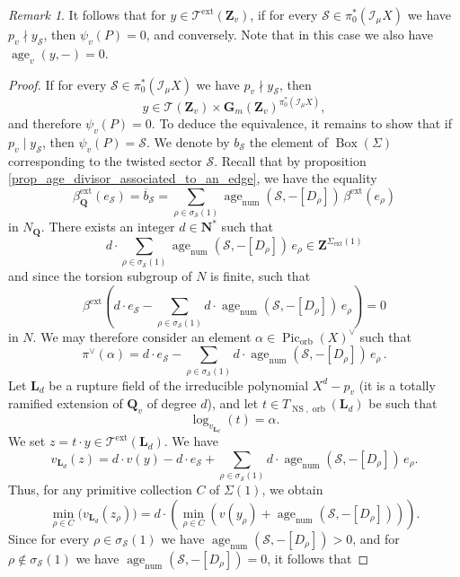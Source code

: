\documentclass{proc-l}
\newcommand{\Z}{\mathbf{Z}}
\newcommand{\N}{\mathbf{N}}
\newcommand{\Q}{\mathbf{Q}}
\newcommand{\Le}{\mathbf{L}}
\newcommand{\G}{\mathbf{G}}
\DeclareMathOperator{\Pic}{Pic}
\DeclareMathOperator{\num}{num}
\DeclareMathOperator{\age}{age}
\DeclareMathOperator{\NS}{NS}
\DeclareMathOperator{\orb}{orb}
\DeclareMathOperator{\Boxe}{Box}
\DeclareMathOperator{\ext}{ext}
\newcommand{\stackS}{\mathcal{S}}
\newcommand{\stackT}{\mathcal{T}}
\newcommand{\sheafI}{\mathcal{I}}
\newcommand{\twistsector}{\pi_0^*(\sheafI_{\mu} X)}
\theoremstyle{definition}
\theoremstyle{remark}
\newtheorem{remark}[theorem]{Remark}
\numberwithin{equation}{section}
\begin{document}
\begin{remark}
It follows that for $y \in \stackT^{\ext}(\Z_v)$, if for every $\stackS \in \twistsector$ we have
$p_v \nmid y_{\stackS}$, then $\psi_v(P) = 0$, and conversely. Note that in this case we also have $\age_v(y,-) = 0$.
\end{remark}

\begin{proof}
If for every $\stackS \in \twistsector$ we have $p_v \nmid y_{\stackS}$, then
\[
y \in \stackT(\Z_v) \times \G_m(\Z_v)^{\twistsector},
\]
and therefore $\psi_v(P) = 0$. To deduce the equivalence, it remains to show that
if $p_v \mid y_{\stackS}$, then $\psi_v(P) = \stackS$. We denote by $b_{\stackS}$ the element of $\Boxe(\Sigma)$ corresponding to the twisted sector $\stackS$. Recall that by proposition \ref{prop_age_divisor_associated_to_an_edge}, we have the equality
\[
\beta_{\Q}^{\ext}(e_{\stackS}) = \overline b_{\stackS}
=
\sum_{\rho \in \sigma_\stackS(1)}
\age_{\num}\!\left(\stackS,-[D_{\rho}]\right)\, \beta^{\ext}(e_{\rho})
\]
in $N_{\Q}$. There exists an integer $d \in \N^{*}$ such that
\[
d \cdot \sum_{\rho \in \sigma_\stackS(1)}
\age_{\num}\!\left(\stackS,-[D_{\rho}]\right)\, e_{\rho}
\in \Z^{\Sigma_{\ext}(1)}
\]
and since the torsion subgroup of $N$ is finite, such that
\[
\beta^{\ext}\!\left( d \cdot e_{\stackS}
-
\sum_{\rho \in \sigma_\stackS(1)}
d \cdot \age_{\num}\!\left(\stackS,-[D_{\rho}]\right)\, e_{\rho}
\right)
= 0 
\]in $N$. We may therefore consider an element $\alpha \in \Pic_{\orb}(X)^{\vee}$ such that
\[
\pi^{\vee}(\alpha)
= 
d \cdot e_{\stackS} -
\sum_{\rho \in \sigma_\stackS(1)}
d \cdot \age_{\num}\!\left(\stackS,-[D_{\rho}]\right)\, e_{\rho} \, .
\]
Let $\Le_d$ be a rupture field of the irreducible polynomial $X^{d}- p_v$ (it is a totally ramified extension of $\Q_v$ of degree $d$), and let
$t \in T_{\NS,\orb}(\Le_d)$ be such that
\[
\log_{v_{\Le_d}}(t) = \alpha .
\]
We set $z = t \cdot y \in \stackT^{\ext}(\Le_d)$. We have
\[
v_{\Le_d}(z)
=
d \cdot v(y)
-
d \cdot e_{\stackS}
+
\sum_{\rho \in \sigma_\stackS(1)}
d \cdot \age_{\num}\!\left(\stackS,-[D_{\rho}]\right)\, e_{\rho}.
\]
Thus, for any primitive collection $C$ of $\Sigma(1)$, we obtain
\[
\min_{\rho \in C}\bigl(v_{\Le_d}(z_{\rho})\bigr)
=
d \cdot
\left(
\min_{\rho \in C}
\left(
v(y_{\rho}) + \age_{\num}\!\left(\stackS,-[D_{\rho}]\right)
\right)
\right).
\]
Since for every $\rho \in \sigma_\stackS(1)$ we have
$\age_{\num}\!\left(\stackS,-[D_{\rho}]\right) > 0$, and for
$\rho \notin \sigma_\stackS(1)$ we have
$\age_{\num}\!\left(\stackS,-[D_{\rho}]\right) = 0$, it follows that

\end{proof}
\end{document}
